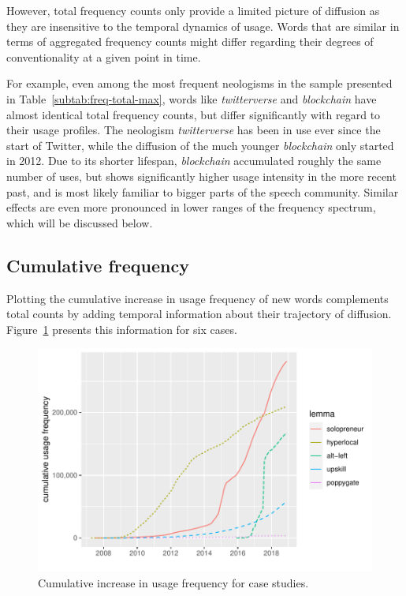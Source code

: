 \documentclass[
  a4paper,
  abstract=on,
  captions=tableabove
  ]{scrartcl}
\begin{document}
  However, total frequency counts only provide a limited picture of diffusion as they are insensitive to the temporal dynamics of usage. Words that are similar in terms of aggregated frequency counts might differ regarding their degrees of conventionality at a given point in time.

    For example, even among the most frequent neologisms in the sample presented in Table~\ref{subtab:freq-total-max}, words like \emph{twitterverse} and \emph{blockchain} have almost identical total frequency counts, but differ significantly with regard to their usage profiles. The neologism \emph{twitterverse} has been in use ever since the start of Twitter, while the diffusion of the much younger \emph{blockchain} only started in 2012. Due to its shorter lifespan, \emph{blockchain} accumulated roughly the same number of uses, but shows significantly higher usage intensity in the more recent past, and is most likely familiar to bigger parts of the speech community. Similar effects are even more pronounced in lower ranges of the frequency spectrum, which will be discussed below.

    \subsection{Cumulative frequency}

Plotting the cumulative increase in usage frequency of new words complements total counts by adding temporal information about their trajectory of diffusion. Figure~\ref{fig:freq_cum_cases} presents this information for six cases.

  \begin{figure}
    \caption{Cumulative increase in usage frequency for case studies.\protect\footnotemark}
    \label{fig:freq_cum_cases}
    \includegraphics[width=\linewidth, height=.8\textheight, keepaspectratio]{img/freq_cum_cases.pdf}
    \centering
  \end{figure}
\end{document}
